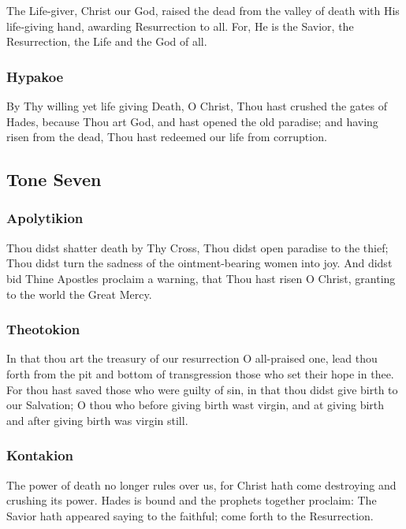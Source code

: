 The Life-giver, Christ our God, raised the dead from the valley of death with His life‑giving hand, awarding Resurrection to all. For, He is the Savior, the Resurrection, the Life and the God of all.

\subsubsection{Hypakoe}

By Thy willing yet life giving Death, O Christ, Thou hast crushed the gates of Hades, because Thou art God, and hast opened the old paradise; and having risen from the dead, Thou hast redeemed our life from corruption.

\subsection{Tone Seven}

\subsubsection{Apolytikion}

Thou didst shatter death by Thy Cross, Thou didst open paradise to the thief; Thou didst turn the sadness of the ointment-bearing women into joy. And didst bid Thine Apostles proclaim a warning, that Thou hast risen O Christ, granting to the world the Great Mercy.

\subsubsection{Theotokion}

In that thou art the treasury of our resurrection O all-praised one, lead thou forth from the pit and bottom of transgression those who set their hope in thee. For thou hast saved those who were guilty of sin, in that thou didst give birth to our Salvation; O thou who before giving birth wast virgin, and at giving birth and after giving birth was virgin still.

\subsubsection{Kontakion}

The power of death no longer rules over us, for Christ hath come destroying and crushing its power. Hades is bound and the prophets together proclaim: The Savior hath appeared saying to the faithful; come forth to the Resurrection.

